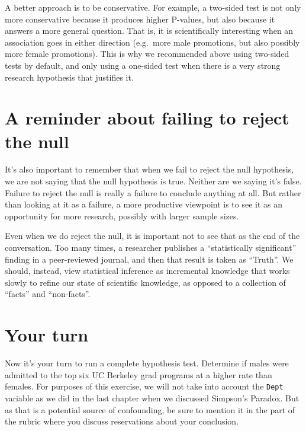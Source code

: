 \documentclass[
]{book}
\begin{document}
A better approach is to be conservative. For example, a two-sided test is not only more conservative because it produces higher P-values, but also because it answers a more general question. That is, it is scientifically interesting when an association goes in either direction (e.g.~more male promotions, but also possibly more female promotions). This is why we recommended above using two-sided tests by default, and only using a one-sided test when there is a very strong research hypothesis that justifies it.

\hypertarget{hypothesis1-fail-to-reject}{%
\section{A reminder about failing to reject the null}\label{hypothesis1-fail-to-reject}}

It's also important to remember that when we fail to reject the null hypothesis, we are not saying that the null hypothesis is true. Neither are we saying it's false. Failure to reject the null is really a failure to conclude anything at all. But rather than looking at it as a failure, a more productive viewpoint is to see it as an opportunity for more research, possibly with larger sample sizes.

Even when we do reject the null, it is important not to see that as the end of the conversation. Too many times, a researcher publishes a ``statistically significant'' finding in a peer-reviewed journal, and then that result is taken as ``Truth''. We should, instead, view statistical inference as incremental knowledge that works slowly to refine our state of scientific knowledge, as opposed to a collection of ``facts'' and ``non-facts''.

\hypertarget{hypothesis1-your-turn}{%
\section{Your turn}\label{hypothesis1-your-turn}}

Now it's your turn to run a complete hypothesis test. Determine if males were admitted to the top six UC Berkeley grad programs at a higher rate than females. For purposes of this exercise, we will not take into account the \texttt{Dept} variable as we did in the last chapter when we discussed Simpson's Paradox. But as that is a potential source of confounding, be sure to mention it in the part of the rubric where you discuss reservations about your conclusion.
\end{document}
